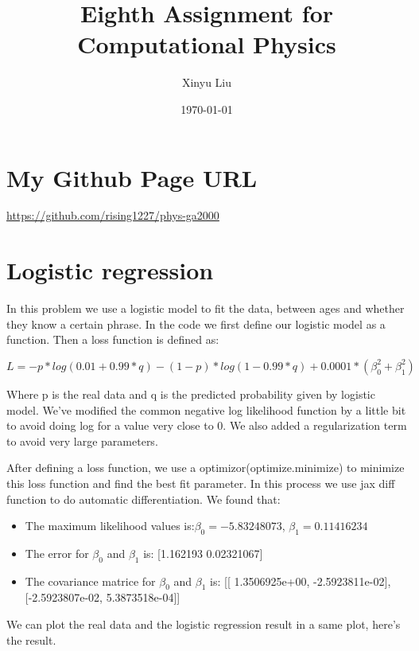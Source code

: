\documentclass[letterpaper,12pt]{article}
\title{Eighth Assignment for Computational Physics}
\date{\today}
\author{Xinyu Liu}
\begin{document}
\maketitle
\tableofcontents

\newpage

\section{My Github Page URL}
\url{https://github.com/rising1227/phys-ga2000}

\section{Logistic regression}

In this problem we use a logistic model to fit the data, between ages and whether they know a certain phrase. In the code we first define our logistic model as a function. Then a loss function is defined as:

\begin{equation}
    L = -p*log(0.01 + 0.99*q) -(1-p)*log(1 - 0.99*q) + 0.0001*(\beta_0^2 + \beta_1^2)
\end{equation}

Where p is the real data and q is the predicted probability given by logistic model. We've modified the common negative log likelihood function by a little bit to avoid doing log for a value very close to 0. We also added a regularization term to avoid very large parameters.

After defining a loss function, we use a optimizor(optimize.minimize) to minimize this loss function and find the best fit parameter. In this process we use jax diff function to do automatic differentiation. We found that:

\begin{itemize}
    \item The maximum likelihood values is:$\beta_0 = -5.83248073$, $\beta_1 = 0.11416234$
    \item The error for $\beta_0$ and $\beta_1$ is: [1.162193   0.02321067]
    \item The covariance matrice for $\beta_0$ and $\beta_1$ is:  [[ 1.3506925e+00, -2.5923811e-02], [-2.5923807e-02, 5.3873518e-04]]
\end{itemize}

We can plot the real data and the logistic regression result in a same plot, here's the result.
\end{document}

